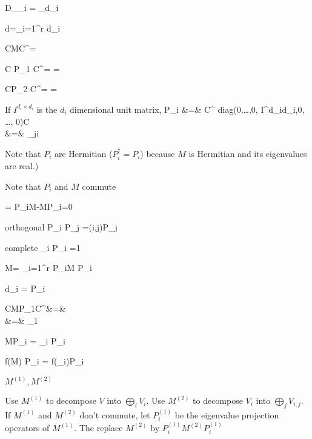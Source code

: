 \beq
D_{\lam_i} =
_{d_i}
\eeq

\beq
d=\sum_{i=1}^r d_i
\eeq


\beq
CMC^\dagger =
\eeq

\beq
C P_1 C^\dagger=
\left[
\begin{array}{cc}
1&0
\\
0&0
\end{array}
\right]
=
\eeq

\beq
CP_2 C^\dagger =
\left[
\begin{array}{cc}
0&0
\\
0&1
\end{array}
\right]
=
\eeq

If $I^{d_i\times d_i}$
is the $d_i$
dimensional unit matrix,
\beqa
P_i &=&
C^\dagger
diag(0,\ldots,0, I^{d_i\times d_i},0, \dots, 0)C
\\
&=&
\prod_{j\neq i}
\eeqa

Note that $P_i$ are Hermitian
($P_i^\dagger = P_i$)
because $M$
is Hermitian and
its eigenvalues are real.)

Note that
$P_i$ and $M$
commute

\beq
[P_i, M]=
P_iM-MP_i=0
\eeq

orthogonal
\beq
P_i P_j =\delta(i,j)P_j
\eeq

complete
\beq
\sum_i P_i =1
\eeq

\beq
M= \sum_{i=1}^r
P_iM P_i
\eeq

\beq
d_i = \tr P_i
\eeq

\beqa
CMP_1C^\dagger &=&
\left[
\begin{array}{cc}
1&0
\\
0&0
\end{array}
\right] 
\\
&=&
\lam_1
\left[
\begin{array}{cc}
1&0
\\
0&0
\end{array}
\right] 
\eeqa

\beq
MP_i = \lam_i P_i \;
\eeq

\beq
f(M) P_i = f(\lam_i)P_i \;
\eeq

$M^{(1)}, M^{(2)}$

\eeq
Use $M^{(1)}$ to decompose $V$
into $\bigoplus_i V_i$.
Use  $M^{(2)}$ to decompose $V_i$ into
$\bigoplus_j V_{i,j}$. 
If $M^{(1)}$ and $M^{(2)}$ don't
commute, let $P^{(1)}_i$ be the eigenvalue 
projection operators of $M^{(1)}$. The replace $M^{(2)}$ by $P^{(1)}_i M^{(2)}P_i^{(1)}$

\eeq



